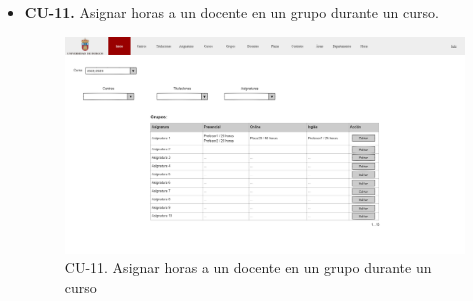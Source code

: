 \begin{itemize}
	\item \textbf{CU-11.} Asignar horas a un docente en un grupo durante un curso.
	\begin{figure}[!h]
		\centering
		\includegraphics[width=\textwidth]{../img/Anexos/Vistas/index.png}
		\caption{CU-11. Asignar horas a un docente en un grupo durante un curso}\label{fig:../img/Anexos/Vistas/index.png}
	\end{figure}
	
	
\FloatBarrier
	
\end{itemize}


